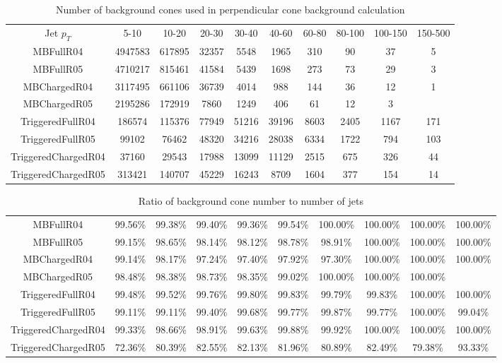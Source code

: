 \begin{table}[h]
\caption{Number of background cones used in perpendicular cone background calculation}
\label{tab:bgstats}
\tiny
\begin{tabular}{c | c | c | c | c | c | c | c | c | c}
Jet $p_T$     &   5-10 & 10-20  & 20-30 & 30-40 & 40-60 & 60-80 & 80-100 & 100-150 & 150-500 \\
MBFullR04 & 4947583 & 617895 & 32357 & 5548 & 1965 & 310 & 90 & 37 & 5 \\
MBFullR05 & 4710217 & 815461 & 41584 & 5439 & 1698 & 273 & 73 & 29 & 3 \\
MBChargedR04 & 3117495 & 661106 & 36739 & 4014 & 988 & 144 & 36 & 12 & 1 \\
MBChargedR05 & 2195286 & 172919 & 7860 & 1249 & 406 & 61 & 12 & 3 \\
TriggeredFullR04 & 186574 & 115376 & 77949 & 51216 & 39196 & 8603 & 2405 & 1167 & 171 \\
TriggeredFullR05 & 99102 & 76462 & 48320 & 34216 & 28038 & 6334 & 1722 & 794 & 103 \\
TriggeredChargedR04 & 37160 & 29543 & 17988 & 13099 & 11129 & 2515 & 675 & 326 & 44 \\
TriggeredChargedR05 & 313421 & 140707 & 45229 & 16243 & 8709 & 1604 & 377 & 154 & 14 \\
\end{tabular}
\end{table}

\begin{table}[h]
\caption{Ratio of background cone number to number of jets}
\label{tab:bgratio}
\tiny
\begin{tabular}{c | c | c | c | c | c | c | c | c | c}
MBFullR04 & 99.56\% & 99.38\% & 99.40\% & 99.36\% & 99.54\% & 100.00\% & 100.00\% & 100.00\% & 100.00\% \\
MBFullR05 & 99.15\% & 98.65\% & 98.14\% & 98.12\% & 98.78\% & 98.91\% & 100.00\% & 100.00\% & 100.00\% \\
MBChargedR04 & 99.14\% & 98.17\% & 97.24\% & 97.40\% & 97.92\% & 97.30\% & 100.00\% & 100.00\% & 100.00\% \\
MBChargedR05 & 98.48\% & 98.38\% & 98.73\% & 98.35\% & 99.02\% & 100.00\% & 100.00\% & 100.00\% \\
TriggeredFullR04 & 99.48\% & 99.52\% & 99.76\% & 99.80\% & 99.83\% & 99.79\% & 99.83\% & 100.00\% & 100.00\% \\
TriggeredFullR05 & 99.11\% & 99.11\% & 99.40\% & 99.68\% & 99.77\% & 99.87\% & 99.77\% & 100.00\% & 99.04\% \\
TriggeredChargedR04 & 99.33\% & 98.66\% & 98.91\% & 99.63\% & 99.88\% & 99.92\% & 100.00\% & 100.00\% & 100.00\% \\
TriggeredChargedR05 & 72.36\% & 80.39\% & 82.55\% & 82.13\% & 81.96\% & 80.89\% & 82.49\% & 79.38\% & 93.33\% \\
\end{tabular}
\end{table}





